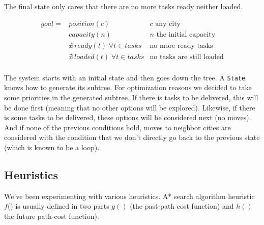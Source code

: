 \documentclass[11pt,a4paper]{article}
\begin{document}
The final state only cares that there are no more tasks ready neither loaded.

\begin{align*}
    goal = &position(c) & c \text{ any city} \\
           &capacity(n) & n \text{ the initial capacity} \\
           &\nexists \: ready(t) \; \forall t \in tasks & \text{no more ready tasks} \\
           &\nexists \: loaded(t) \; \forall t \in tasks & \text{no tasks are still loaded} \\
\end{align*}

The system starts with an initial state and then goes down the tree. A
\texttt{State} knows how to generate its subtree. For optimization reasons we
decided to take some priorities in the generated subtree. If there is tasks to
be delivered, this will be done first (meaning that no other options will be
explored). Likewise, if there is some tasks to be delivered, these options will
be considered next (no moves). And if none of the previous conditions hold,
moves to neighbor cities are considered with the condition that we don't
directly go back to the previous state (which is known to be a loop).


\subsection*{Heuristics}

We've been experimenting with various heuristics. A* search algorithm heuristic
$f$() is usually defined in two parts $g()$ (the past-path cost function) and $h()$ 
the future path-cost function).
\end{document}
